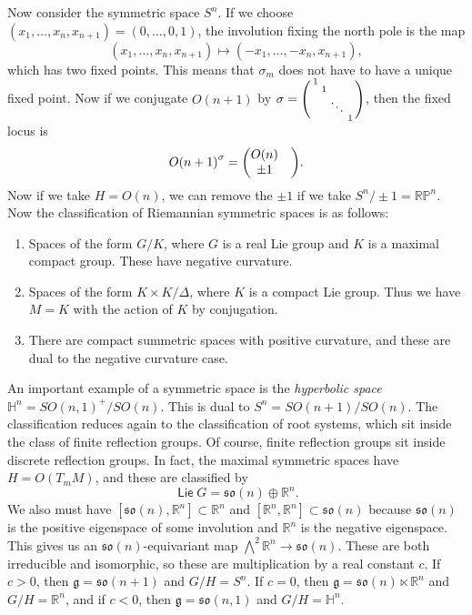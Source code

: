 \documentclass[leqno, openany]{memoir}
\theoremstyle{definition}
\theoremstyle{remark}
\theoremstyle{plain}
\theoremstyle{definition}
\theoremstyle{remark}
\newcommand{\R}{\mathbb{R}}
\renewcommand{\H}{\mathbb{H}}
\renewcommand{\P}{\mathbb{P}}
\newcommand{\mf}[1]{\mathfrak{#1}}
\DeclareMathOperator{\Lie}{\mathsf{Lie}}
\begin{document}
Now consider the symmetric space $S^n$. If we choose $( x_1, \ldots, x_n,
x_{n+1} ) = (0,\ldots,0, 1)$, the involution fixing the north pole is the map
\[ (x_1, \ldots, x_n, x_{n+1}) \mapsto (-x_1, \ldots, -x_n, x_{n+1}), \] which
has two fixed points. This means that $\sigma_m$ does not have to have a unique
fixed point. Now if we conjugate $O(n+1)$ by $\sigma = \begin{psmallmatrix} 1 &
& \\ & 1 & \\ & & \ddots \\ & & & 1 \end{psmallmatrix}$, then the fixed locus
    is \[ {O(n+1)}^{\sigma} = \mqty(O(n) & \\ \pm 1 & ). \] Now if we take $H =
    O(n)$, we can remove the $\pm 1$ if we take $S^n/\pm 1 = \R\P^n$. Now the
    classification of Riemannian symmetric spaces is as follows:
    \begin{enumerate} \item Spaces of the form $G/K$, where $G$ is a real Lie
        group and $K$ is a maximal compact group. These have negative
        curvature.  \item Spaces of the form $K \times K / \Delta$, where $K$
        is a compact Lie group. Thus we have $M = K$ with the action of $K$ by
        conjugation.  \item There are compact summetric spaces with positive
curvature, and these are dual to the negative curvature case.  \end{enumerate}

An important example of a symmetric space is the \textit{hyperbolic space}
$\H^n = { SO(n,1) }^+ / SO(n)$. This is dual to $S^n = SO(n+1)/SO(n)$. The
classification reduces again to the classification of root systems, which sit
inside the class of finite reflection groups. Of course, finite reflection
groups sit inside discrete reflection groups. In fact, the maximal symmetric
spaces have $H = O(T_m M)$, and these are classified by \[ \Lie G = \mf{so}(n)
\oplus \R^n. \] We also must have $[\mf{so}(n), \R^n] \subset \R^n$ and $[\R^n,
\R^n] \subset \mf{so}(n)$ because $\mf{so}(n)$ is the positive eigenspace of
some involution and $\R^n$ is the negative eigenspace. This gives us an
$\mf{so}(n)$-equivariant map $\bigwedge^2 \R^n \to \mf{so}(n)$. These are both
irreducible and isomorphic, so these are multiplication by a real constant $c$.
If $c > 0$, then $\mf{g} = \mf{so}(n+1)$ and $G/H = S^n$. If $c = 0$, then
$\mf{g} = \mf{so}(n) \ltimes \R^n$ and $G/H = \R^n$, and if $c < 0$, then
$\mf{g} = \mf{so}(n,1)$ and $G/H = \H^n$.
\end{document}
